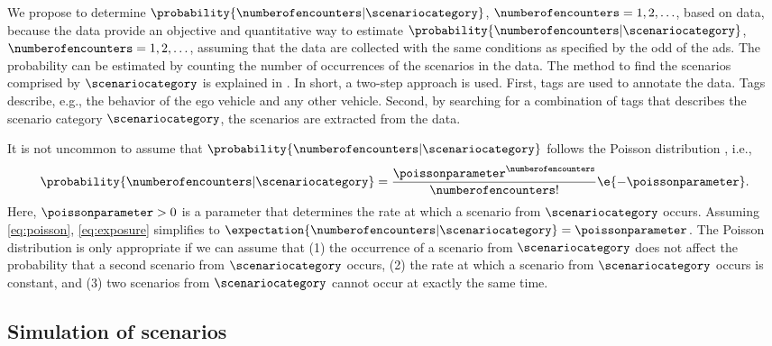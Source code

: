 We propose to determine $\probability{\numberofencounters|\scenariocategory}$, $\numberofencounters=1,2,\ldots$, based on data, because the data provide an objective and quantitative way to estimate $\probability{\numberofencounters|\scenariocategory}$, $\numberofencounters=1,2,\ldots$, assuming that the data are collected with the same conditions as specified by the \ac{odd} of the \ac{ads}.
The probability can be estimated by counting the number of occurrences of the scenarios in the data.
The method to find the scenarios comprised by $\scenariocategory$ is explained in \autocite{degelder2020scenariomining}.
In short, a two-step approach is used.
First, tags are used to annotate the data.
Tags describe, e.g., the behavior of the ego vehicle and any other vehicle.
Second, by searching for a combination of tags that describes the scenario category $\scenariocategory$, the scenarios are extracted from the data.

\begin{remark}
	It is not uncommon to assume that $\probability{\numberofencounters|\scenariocategory}$ follows the Poisson distribution \autocite{nicholson1993accidents, wachenfeld2017new, gyllenhammar2020towards}, i.e., 
	\begin{equation}
		\label{eq:poisson}
		\probability{\numberofencounters|\scenariocategory} = 
		\frac{\poissonparameter^{\numberofencounters}}{\numberofencounters!} \e{-\poissonparameter}.
	\end{equation}
	Here, $\poissonparameter>0$ is a parameter that determines the rate at which a scenario from $\scenariocategory$ occurs.
	Assuming \cref{eq:poisson}, \cref{eq:exposure} simplifies to $\expectation{\numberofencounters|\scenariocategory}=\poissonparameter$.
	The Poisson distribution is only appropriate if we can assume that (1) the occurrence of a scenario from $\scenariocategory$ does not affect the probability that a second scenario from $\scenariocategory$ occurs, (2) the rate at which a scenario from $\scenariocategory$ occurs is constant, and (3) two scenarios from $\scenariocategory$ cannot occur at exactly the same time.
\end{remark}



\subsection{Simulation of scenarios}
\label{sec:simulation}

